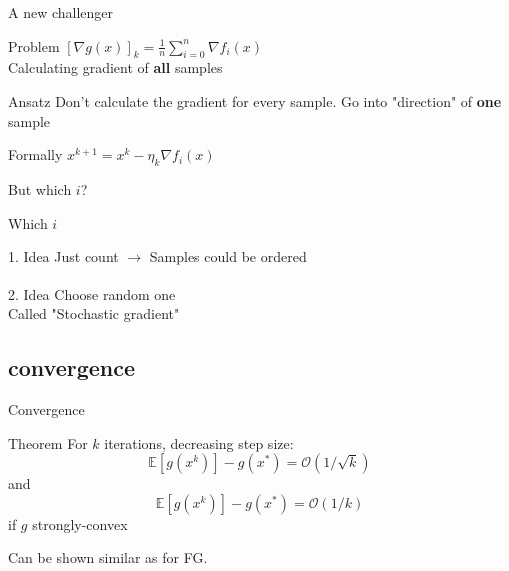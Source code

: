 \documentclass{beamer}
\numberwithin{equation}{aufgabe}
\begin{document}
\begin{frame}{A new challenger}
    \begin{alertblock}{Problem}
        $[ \nabla g(x) ]_k = \frac{1}{n} \sum_{i=0}^n \nabla f_i(x)$\\
        Calculating gradient of \textbf{all} samples
    \end{alertblock}
    \pause
    \begin{block}{Ansatz}
        Don't calculate the gradient for every sample. Go into "direction" of \textbf{one} sample
    \end{block}
    \pause
    \begin{exampleblock}{Formally}
        $x^{k+1} = x^k - \eta_k \nabla f_i(x)$
    \end{exampleblock}
    \pause
    But which $i$?
\end{frame}

\begin{frame}{Which $i$}
    \begin{block}{1. Idea}
        Just count 
        \pause 
        $\xrightarrow[]{}$ Samples could be ordered
    \end{block}
    \pause
    \begin{block}{2. Idea}
        Choose random one\\
        \pause
        Called "Stochastic gradient"
    \end{block}
\end{frame}

\subsection{convergence}
\begin{frame}{Convergence}
    \begin{block}{Theorem}
        For $k$ iterations, decreasing step size:
        $$\mathbb{E}[g(x^k)]-g(x^*) = \mathcal{O}(1/\sqrt{k})$$
        and
        \pause
        $$\mathbb{E}[g(x^k)]-g(x^*) = \mathcal{O}(1/k)$$
        if $g$ strongly-convex
    \end{block}
    \pause
    Can be shown similar as for FG.
\end{frame}

\end{document}
